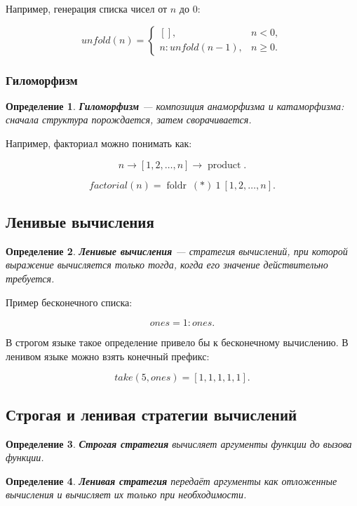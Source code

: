 \documentclass[12pt,a4paper]{article}
\newtheorem{definition}{Определение}
\begin{document}
Например, генерация списка чисел от $n$ до $0$:

\[
unfold(n) =
\begin{cases}
[], & n < 0, \\
n : unfold(n-1), & n \ge 0.
\end{cases}
\]

\subsubsection{Гиломорфизм}

\begin{definition}
\textbf{Гиломорфизм} --- композиция анаморфизма и катаморфизма: сначала структура порождается, затем сворачивается.
\end{definition}

Например, факториал можно понимать как:

\[
n \to [1,2,\dots,n] \to \operatorname{product}.
\]

\[
factorial(n) = \operatorname{foldr}\ (*)\ 1\ [1,2,\dots,n].
\]

\subsection{Ленивые вычисления}

\begin{definition}
\textbf{Ленивые вычисления} --- стратегия вычислений, при которой выражение вычисляется только тогда, когда его значение действительно требуется.
\end{definition}

Пример бесконечного списка:

\[
ones = 1 : ones.
\]

В строгом языке такое определение привело бы к бесконечному вычислению. В ленивом языке можно взять конечный префикс:

\[
take(5, ones) = [1,1,1,1,1].
\]

\subsection{Строгая и ленивая стратегии вычислений}

\begin{definition}
\textbf{Строгая стратегия} вычисляет аргументы функции до вызова функции.
\end{definition}

\begin{definition}
\textbf{Ленивая стратегия} передаёт аргументы как отложенные вычисления и вычисляет их только при необходимости.
\end{definition}
\end{document}
